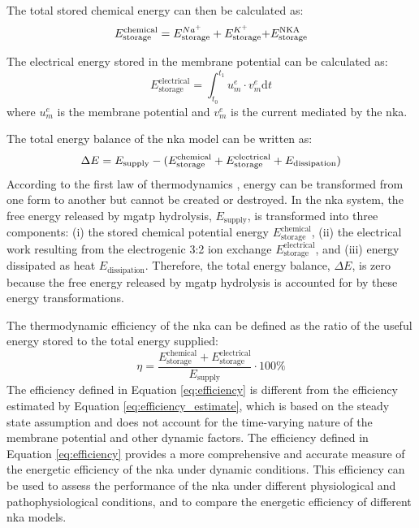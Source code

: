 \documentclass{biophys-new}
\newcommand{\rev}[1]{{\color{black} #1}}
\begin{document}
The total stored chemical energy can then be calculated as:
\begin{equation}
      \label{eq:total_energy_storage}
      E_\text{storage}^\text{chemical} = E_\text{storage}^{Na^+} + E_\text{storage}^{K^+} \rev{+ E_\text{storage}^\text{NKA}}
\end{equation}

The electrical energy stored in the membrane potential can be calculated as:
\begin{equation}  
      \label{eq:electrical_energy}
      E_\text{storage}^\text{electrical} = \int_{t_0}^{t_1} u_m^e \cdot v_m^e \mathrm{d}t
\end{equation}
where \rev{$u_m^e$} is the membrane potential and \rev{$v_m^e$} is the current mediated by the \gls{nka}.

The total energy balance of the \gls{nka} model can be written as:
\begin{equation}
      \label{eq:total_energy_balance}
     \rev{\Delta E = E_\text{supply} - (E_\text{storage}^\text{chemical} + E_\text{storage}^\text{electrical} + E_\text{dissipation})} 
\end{equation}
\rev{According to the first law of thermodynamics \cite{atkins2023physical}, energy can be transformed from one form to another but cannot be created or destroyed. In the \gls{nka} system, the free energy released by \gls{mgatp} hydrolysis, $E_\text{supply}$, is transformed into three components: (i) the stored chemical potential energy $E_\text{storage}^\text{chemical}$, (ii) the electrical work resulting from the electrogenic 3:2 ion exchange $E_\text{storage}^\text{electrical}$, and (iii) energy dissipated as heat $E_\text{dissipation}$. Therefore, the total energy balance, $\Delta E$, is zero because the free energy released by \gls{mgatp} hydrolysis is accounted for by these energy transformations.} 

The thermodynamic efficiency of the \gls{nka} can be defined as the ratio of the useful energy stored to the total energy supplied:
\begin{equation}
      \label{eq:efficiency}
      \eta = \frac{E_\text{storage}^\text{chemical} + E_\text{storage}^\text{electrical}}{E_\text{supply}}\cdot 100\%
\end{equation}
The efficiency defined in Equation \ref{eq:efficiency} is different from the efficiency estimated by Equation \ref{eq:efficiency_estimate}, which is based on the steady state assumption and does not account for the time-varying nature of the membrane potential and other dynamic factors. The efficiency defined in Equation \ref{eq:efficiency} provides a more comprehensive and accurate measure of the energetic efficiency of the \gls{nka} under dynamic conditions. This efficiency can be used to assess the performance of the \gls{nka} under different physiological and pathophysiological conditions, and to compare the energetic efficiency of different \gls{nka} models.
\end{document}
